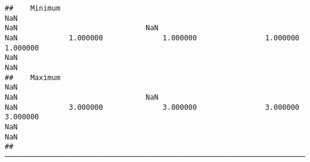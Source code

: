 \documentclass[
]{article}
\begin{document}
\begin{verbatim}
##    Minimum                                                                  NaN                                                                  NaN                              NaN                                                                  NaN            1.000000              1.000000                1.000000                1.000000                                                                  NaN                                                                  NaN   
##    Maximum                                                                  NaN                                                                  NaN                              NaN                                                                  NaN            3.000000              3.000000                3.000000                3.000000                                                                  NaN                                                                  NaN   
##  ───────────────────────────────────────────────────────────────────────────────────────────────────────────────────────────────────────────────────────────────────────────────────────────────────────────────────────────────────────────────────────────────────────────────────────────────────────────────────────────────────────────────────────────────────────────────────────────────────────────────────────────────────────────────────────────────────────────────────────────────
\end{verbatim}
\end{document}
